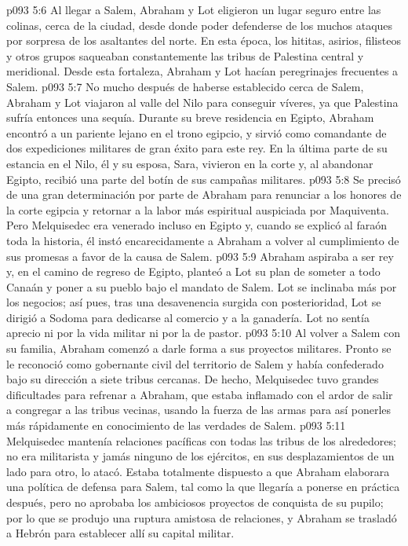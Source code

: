 \vs p093 5:6 Al llegar a Salem, Abraham y Lot eligieron un lugar seguro entre las colinas, cerca de la ciudad, desde donde poder defenderse de los muchos ataques por sorpresa de los asaltantes del norte. En esta época, los hititas, asirios, filisteos y otros grupos saqueaban constantemente las tribus de Palestina central y meridional. Desde esta fortaleza, Abraham y Lot hacían peregrinajes frecuentes a Salem.
\vs p093 5:7 \pc No mucho después de haberse establecido cerca de Salem, Abraham y Lot viajaron al valle del Nilo para conseguir víveres, ya que Palestina sufría entonces una sequía. Durante su breve residencia en Egipto, Abraham encontró a un pariente lejano en el trono egipcio, y sirvió como comandante de dos expediciones militares de gran éxito para este rey. En la última parte de su estancia en el Nilo, él y su esposa, Sara, vivieron en la corte y, al abandonar Egipto, recibió una parte del botín de sus campañas militares.
\vs p093 5:8 Se precisó de una gran determinación por parte de Abraham para renunciar a los honores de la corte egipcia y retornar a la labor más espiritual auspiciada por Maquiventa. Pero Melquisedec era venerado incluso en Egipto y, cuando se explicó al faraón toda la historia, él instó encarecidamente a Abraham a volver al cumplimiento de sus promesas a favor de la causa de Salem.
\vs p093 5:9 \pc Abraham aspiraba a ser rey y, en el camino de regreso de Egipto, planteó a Lot su plan de someter a todo Canaán y poner a su pueblo bajo el mandato de Salem. Lot se inclinaba más por los negocios; así pues, tras una desavenencia surgida con posterioridad, Lot se dirigió a Sodoma para dedicarse al comercio y a la ganadería. Lot no sentía aprecio ni por la vida militar ni por la de pastor.
\vs p093 5:10 Al volver a Salem con su familia, Abraham comenzó a darle forma a sus proyectos militares. Pronto se le reconoció como gobernante civil del territorio de Salem y había confederado bajo su dirección a siete tribus cercanas. De hecho, Melquisedec tuvo grandes dificultades para refrenar a Abraham, que estaba inflamado con el ardor de salir a congregar a las tribus vecinas, usando la fuerza de las armas para así ponerles más rápidamente en conocimiento de las verdades de Salem.
\vs p093 5:11 Melquisedec mantenía relaciones pacíficas con todas las tribus de los alrededores; no era militarista y jamás ninguno de los ejércitos, en sus desplazamientos de un lado para otro, lo atacó. Estaba totalmente dispuesto a que Abraham elaborara una política de defensa para Salem, tal como la que llegaría a ponerse en práctica después, pero no aprobaba los ambiciosos proyectos de conquista de su pupilo; por lo que se produjo una ruptura amistosa de relaciones, y Abraham se trasladó a Hebrón para establecer allí su capital militar.
